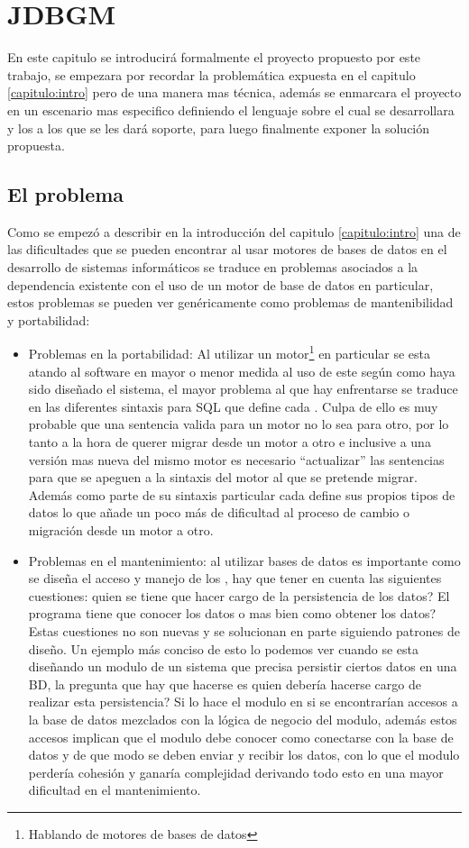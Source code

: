 \chapter{JDBGM}
%
%
En este capitulo se introducirá formalmente el proyecto propuesto por este trabajo, se empezara por recordar la problemática expuesta en el capitulo \ref{capitulo:intro} pero de una manera mas técnica, además se enmarcara el proyecto en un escenario mas especifico definiendo el lenguaje sobre el cual se desarrollara y los \dd a los que se les dará soporte, para luego finalmente exponer la solución propuesta.
%
\section{El problema}
%
Como se empezó a describir en la introducción del capitulo \ref{capitulo:intro} una de las dificultades que se pueden encontrar al usar motores de bases de datos en el desarrollo de sistemas informáticos se traduce en problemas asociados a la dependencia existente con el uso de un motor de base de datos en particular, estos problemas se pueden ver genéricamente como problemas de mantenibilidad y portabilidad:
%
\begin{itemize}
%
\item Problemas en la portabilidad: Al utilizar un motor\footnote{Hablando de motores de bases de datos} en particular se esta atando al software en mayor o menor medida al uso de este según como haya sido diseñado el sistema, el mayor problema al que hay enfrentarse se traduce en las diferentes sintaxis para SQL que define cada \dd. Culpa de ello es muy probable que una sentencia valida para un motor no lo sea para otro, por lo tanto a la hora de querer migrar desde un motor a otro e inclusive a una versión mas nueva del mismo motor es necesario  ``actualizar'' las sentencias para que se apeguen a la sintaxis del motor al que se pretende migrar. Además como parte de su sintaxis particular cada \dd define sus propios tipos de datos lo que añade un poco más de dificultad al proceso de cambio o migración desde un motor a otro.  
%
\item  Problemas en el mantenimiento: al utilizar bases de datos es importante como se diseña el acceso y manejo de los \dd, hay que tener en cuenta las siguientes cuestiones: quien se tiene que hacer cargo de la persistencia de los datos? El programa tiene que conocer los datos o mas bien como obtener los datos? Estas cuestiones no son nuevas y se solucionan en parte siguiendo patrones de diseño. Un ejemplo más conciso de esto lo podemos ver cuando se esta diseñando un modulo de un sistema que precisa persistir ciertos datos en una BD, la pregunta que hay que hacerse es quien debería hacerse cargo de realizar esta persistencia? Si lo hace el modulo en si se encontrarían accesos a la base de datos mezclados con la lógica de negocio del modulo, además estos accesos implican que el modulo debe conocer como conectarse con la base de datos y de que modo se deben enviar y recibir los datos, con lo que el modulo	perdería cohesión y ganaría complejidad derivando todo esto en una mayor dificultad en el mantenimiento.
\end{itemize}
